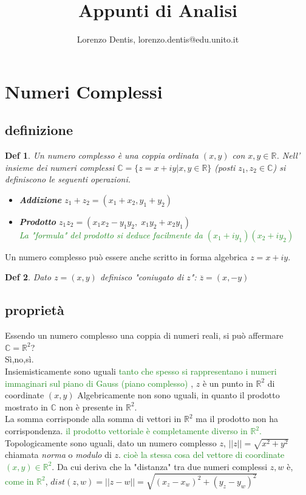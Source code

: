\documentclass[a4paper]{article}
\newtheorem*{definition}{Def}
\newcommand{\appunto}[1]{\textcolor{ForestGreen}{#1}}
\newcommand{\R}[0]{\mathbb{R}}
\begin{document}
\author{Lorenzo Dentis, lorenzo.dentis@edu.unito.it}
\title{Appunti di Analisi}
\maketitle
\section{Numeri Complessi}
\subsection{definizione}
\begin{definition}
	Un numero complesso è una coppia ordinata $ (x,y) $ con $ x,y \in \mathbb{R} $.
	Nell' insieme dei numeri complessi $ \mathbb{C} = \{z = x + iy | x,y \in \mathbb{R}\} $ (posti $z_1,z_2 \in \mathbb{C}$) si definiscono le seguenti operazioni.
	\begin{itemize}
		\item[] \textbf{Addizione} $z_1+z_2 = (x_1+x_2, y_1 + y_2)$
		\item[] \textbf{Prodotto} $z_1z_2 = (x_1x_2 - y_1y_2,\; x_1y_2 + x_2y_1) $\\
			\appunto{La "formula" del prodotto si deduce facilmente da $(x_1 + iy_1) (x_2 + iy_2)$}
	\end{itemize}
\end{definition}
Un numero complesso può essere anche scritto in forma algebrica $z= x+iy$.
\begin{definition}
	Dato $z= (x,y)$ definisco "coniugato di $z$": $\overline z = (x,-y)$
\end{definition}
\subsection{proprietà}
Essendo un numero complesso una coppia di numeri reali, si può affermare $\mathbb{C} = \mathbb{R}^2$?\\
Sì,no,sì.\\ 
Insiemisticamente sono uguali \appunto{tanto che spesso si rappresentano i numeri immaginari sul piano di Gauss (piano complesso)} , $z$ è un punto in $\R^2$ di coordinate $(x,y)$
Algebricamente non sono uguali, in quanto il prodotto mostrato in $\mathbb{C}$ non è presente in $\mathbb{R}^2$.\\
La somma corrisponde alla somma di vettori in $\R^2$ ma il prodotto non ha corrispondenza.
\appunto{il prodotto vettoriale è  completamente diverso in $\mathbb{R}^2$.}\\
Topologicamente sono uguali, dato un numero complesso $z$, $||z|| = \sqrt{x^2 + y^2}$ chiamata \textit{norma} o \textit{modulo} di $z$. \appunto{cioè la stessa cosa del vettore di coordinate $(x,y) \in \R^2$}.
Da cui deriva che la "distanza" tra due numeri complessi $z,w$ è, \appunto{come in $\R^2$}, $dist(z,w)=||z-w|| = \sqrt{(x_z - x_w)^2 + (y_z - y_w)^2}$
\end{document}
